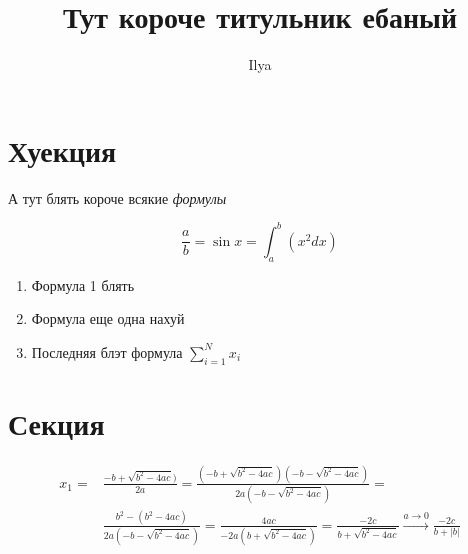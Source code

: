 \documentclass[12pt]{article}
\title{Тут короче титульник ебаный}
\author{Ilya}
\begin{document}
\maketitle

\begin{abstract}

\end{abstract}

\section{Хуекция}

А тут блять короче всякие \textit{формулы}

\[\frac{a}{b} = \sin{x} = \int_a^b(x^2dx)\]

\begin{enumerate}
	\item Формула 1 блять
	\item Формула еще одна нахуй
	\item Последняя блэт формула $\sum_{i=1}^{N}x_i$
\end{enumerate}

\section{Секция}
\begin{align*}
    x_{1} = &\frac{-b + \sqrt{b^2-4ac})} {2a} = 
\frac{(-b + \sqrt{b^2-4ac})(-b - \sqrt{b^2-4ac})} {2a(-b - \sqrt{b^2-4ac})} = \\
&\frac{b^2 - (b^2-4ac)} {2a(-b - \sqrt{b^2-4ac})} =  \frac{4ac} {-2a(b + \sqrt{b^2-4ac})} = 
\frac{-2c} {b+\sqrt{b^2-4ac}} \xrightarrow{a\to0}
\frac{-2c} {b + |b|}
\end{align*}
\end{document}
